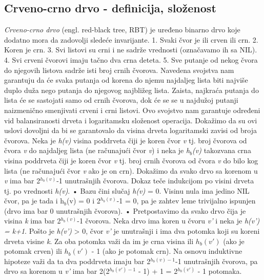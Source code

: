 \documentclass{article}
\begin{document}
\subsection{Crveno-crno drvo - definicija, složenost}
\textit{Crveno-crno drvo} (engl. red-black tree, RBT) je uređeno binarno drvo koje dodatno mora da zadovolji sledeće invarijante.
\newline \hspace*{0.4cm}1. Svaki čvor je ili crven ili crn.
\newline \hspace*{0.4cm}2. Koren je crn.
\newline \hspace*{0.4cm}3. Svi listovi su crni i ne sadrže vrednosti (označavamo ih sa NIL).
\newline \hspace*{0.4cm}4. Svi crveni čvorovi imaju tačno dva crna deteta.
\newline \hspace*{0.4cm}5. Sve putanje od nekog čvora do njegovih listova sadrže isti broj crnih čvorova.
\newline
Navedena svojstva nam garantuju da će svaka putanja od korena do njemu
najdaljeg lista biti najviše duplo duža nego putanja do njegovog najbližeg lista.
Zaista, najkraća putanja do lista će se sastojati samo od crnih čvorova, dok će se
se u najdužoj putanji naizmenično smenjivati crveni i crni listovi. Ovo svojstvo nam garantuje određeni vid balansiranosti drveta i
logaritamsku složenost operacija.
\newline Dokažimo da su ovi uslovi dovoljni da bi se garantovalo da visina drveta logaritamski zavisi od broja čvorova. 
\newline Neka je \textit{h(v)} visina poddrveta čiji je koren čvor
\textit{v} tj. broj čvorova od čvora \textit{v} do najdaljeg lista (ne računajući čvor \textit{v}) i neka je
\textit{h$_b$(v)} takozvana crna visina poddrveta čiji je koren čvor \textit{v} tj. broj crnih čvorova
od čvora \textit{v} do bilo kog lista (ne računajući čvor \textit{v} ako je on crn).
\newline Dokažimo da svako drvo sa korenom u \textit{v} ima bar 
2$^{h_b(v)}$-1 unutrašnjih čvorova.
Dokaz teče indukcijom po visini drveta tj. po vrednosti \textit{h(v)}.
\newline \hspace*{0.4cm}• Bazu čini slučaj \textit{h(v)} = 0. Visinu nula ima jedino NIL čvor, pa je tada i
h$_b$(v) = 0 i 2$^{h_b(v)}$-1 = 0, pa je zahtev leme trivijalno ispunjen (drvo ima bar 0 unutrašnjih čvorova).
\newline \hspace*{0.4cm}• Pretpostavimo da svako drvo čija je visina \textit{k} ima
bar 2$^{h_b(v)}$-1 čvorova. Neka drvo ima koren u čvoru \textit{v'} i neka je \textit{h(v') = k+1}.
Pošto je \textit{h(v')} > 0, čvor \textit{v'} je unutrašnji i ima dva potomka koji su koreni drveta visine \textit{k}. Za oba potomka važi da im je crna visina ili $h_b(v')$ (ako je
potomak crven) ili $h_b(v')$ - 1 (ako je potomak crn). Na osnovu induktivne
hipoteze važi da ta dva poddrveta imaju bar 2$^{h_b(v)-1}$-1 unutrašnjih
čvorova, pa drvo sa korenom u \textit{v'} ima bar 2(2$^{h_b(v')-1}$ - 1) + 1 = 2$^{h_b(v')}$ - 1 potomaka.
\end{document}
